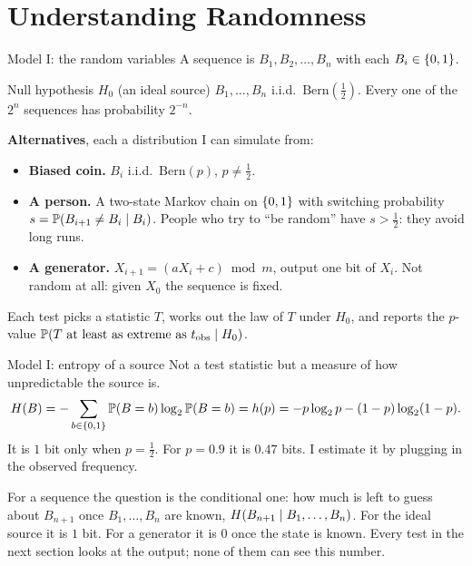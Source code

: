 \documentclass[10pt,aspectratio=169]{beamer}
\newcommand{\Bern}{\mathrm{Bern}}
\begin{document}
\section[Randomness]{Understanding Randomness}

\begin{frame}{Model I: the random variables}
  A sequence is $B_1, B_2, \dots, B_n$ with each $B_i \in \{0,1\}$.
  \medskip
  \begin{block}{Null hypothesis $H_0$ (an ideal source)}
    $B_1, \dots, B_n$ i.i.d.\ $\Bern(\tfrac12)$.
    Every one of the $2^n$ sequences has probability $2^{-n}$.
  \end{block}
  \pause
  \medskip
  \textbf{Alternatives}, each a distribution I can simulate from:
  \begin{itemize}
    \item \textbf{Biased coin.} $B_i$ i.i.d.\ $\Bern(p)$, $p \ne \tfrac12$.
    \item \textbf{A person.} A two-state Markov chain on $\{0,1\}$ with
          switching probability $s = \mathbb{P}\!\left(B_{i+1} \ne B_i \mid B_i\right)$.
          People who try to ``be random'' have $s > \tfrac12$: they
          avoid long runs.
    \item \textbf{A generator.} $X_{i+1} = (aX_i + c) \bmod m$, output
          one bit of $X_i$. Not random at all: given $X_0$ the
          sequence is fixed.
  \end{itemize}
  \pause
  \medskip
  Each test picks a statistic $T$, works out the law of $T$ under
  $H_0$, and reports the $p$-value
  $\mathbb{P}\!\left(T \text{ at least as extreme as } t_{\mathrm{obs}} \mid H_0\right)$.
\end{frame}

\begin{frame}{Model I: entropy of a source}
  Not a test statistic but a measure of how unpredictable the source
  is.
  \[
    H\!\left(B\right) = -\sum_{b \in \{0,1\}} \mathbb{P}\!\left(B = b\right)\log_2 \mathbb{P}\!\left(B = b\right)
            = h(p) = -p\log_2 p - (1-p)\log_2(1-p).
  \]
  It is $1$ bit only when $p = \tfrac12$. For $p = 0.9$ it is
  $0.47$ bits. I estimate it by plugging in the observed frequency.
  \pause
  \medskip

  For a sequence the question is the conditional one: how much is
  left to guess about $B_{n+1}$ once $B_1, \dots, B_n$ are known,
  $H\!\left(B_{n+1} \mid B_1,\dots,B_n\right)$. For the ideal source it is $1$ bit.
  For a generator it is $0$ once the state is known. Every test in the
  next section looks at the output; none of them can see this number.
\end{frame}
\end{document}
